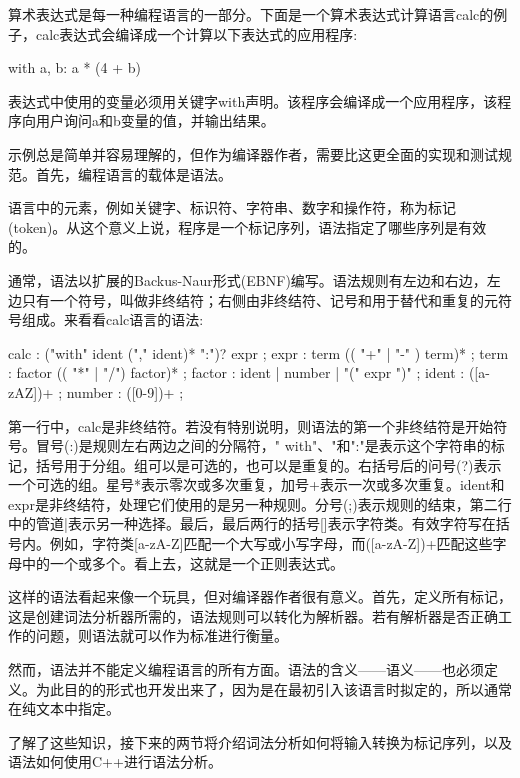 
算术表达式是每一种编程语言的一部分。下面是一个算术表达式计算语言calc的例子，calc表达式会编译成一个计算以下表达式的应用程序:

\begin{shell}
with a, b: a * (4 + b)
\end{shell}

表达式中使用的变量必须用关键字with声明。该程序会编译成一个应用程序，该程序向用户询问a和b变量的值，并输出结果。

示例总是简单并容易理解的，但作为编译器作者，需要比这更全面的实现和测试规范。首先，编程语言的载体是语法。


语言中的元素，例如关键字、标识符、字符串、数字和操作符，称为标记(token)。从这个意义上说，程序是一个标记序列，语法指定了哪些序列是有效的。

通常，语法以扩展的Backus-Naur形式(EBNF)编写。语法规则有左边和右边，左边只有一个符号，叫做非终结符；右侧由非终结符、记号和用于替代和重复的元符号组成。来看看calc语言的语法:

\begin{shell}
calc : ("with" ident ("," ident)* ":")? expr ;
expr : term (( "+" | "-" ) term)* ;
term : factor (( "*" | "/") factor)* ;
factor : ident | number | "(" expr ")" ;
ident : ([a-zAZ])+ ;
number : ([0-9])+ ;
\end{shell}

第一行中，calc是非终结符。若没有特别说明，则语法的第一个非终结符是开始符号。冒号(:)是规则左右两边之间的分隔符，" with"、"和":"是表示这个字符串的标记，括号用于分组。组可以是可选的，也可以是重复的。右括号后的问号(?)表示一个可选的组。星号*表示零次或多次重复，加号+表示一次或多次重复。ident和expr是非终结符，处理它们使用的是另一种规则。分号(;)表示规则的结束，第二行中的管道|表示另一种选择。最后，最后两行的括号[]表示字符类。有效字符写在括号内。例如，字符类[a-zA-Z]匹配一个大写或小写字母，而([a-zA-Z])+匹配这些字母中的一个或多个。看上去，这就是一个正则表达式。


这样的语法看起来像一个玩具，但对编译器作者很有意义。首先，定义所有标记，这是创建词法分析器所需的，语法规则可以转化为解析器。若有解析器是否正确工作的问题，则语法就可以作为标准进行衡量。

然而，语法并不能定义编程语言的所有方面。语法的含义——语义——也必须定义。为此目的的形式也开发出来了，因为是在最初引入该语言时拟定的，所以通常在纯文本中指定。

了解了这些知识，接下来的两节将介绍词法分析如何将输入转换为标记序列，以及语法如何使用C++进行语法分析。